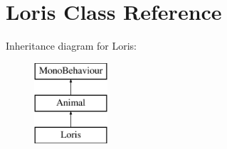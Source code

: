 \hypertarget{class_loris}{}\section{Loris Class Reference}
\label{class_loris}
Inheritance diagram for Loris\+:\begin{figure}[H]
\begin{center}
\leavevmode
\includegraphics[height=3.000000cm]{class_loris}
\end{center}
\end{figure}

